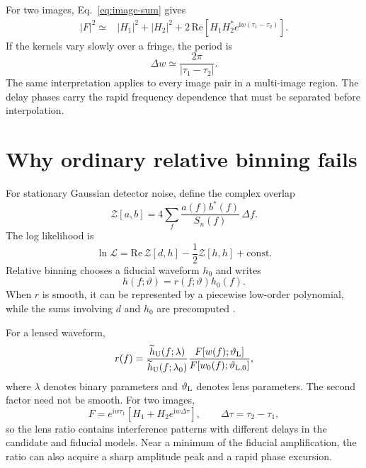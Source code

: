 \documentclass[aps,prd,twocolumn,nofootinbib,superscriptaddress,floatfix]{revtex4-2}
\newcommand{\ii}{\mathrm{i}}
\newcommand{\cZ}{\mathcal{Z}}
\begin{document}
For two images, Eq.~\eqref{eq:image-sum} gives
\begin{align}
 |F|^2\simeq{}&|H_1|^2+|H_2|^2
 +2\,\mathrm{Re}\!\left[
 H_1H_2^*e^{\ii w(\tau_1-\tau_2)}\right].
 \label{eq:two-image-interference}
\end{align}
If the kernels vary slowly over a fringe, the period is
\begin{equation}
 \Delta w\simeq\frac{2\pi}{|\tau_1-\tau_2|}.
 \label{eq:fringe-period}
\end{equation}
The same interpretation applies to every image pair in a multi-image region.
The delay phases carry the rapid frequency dependence that must be separated
before interpolation.

\section{Why ordinary relative binning fails}
\label{sec:rbfailure}

For stationary Gaussian detector noise, define the complex overlap
\begin{equation}
 \cZ[a,b]=4\sum_f\frac{a(f)b^*(f)}{S_n(f)}\,\Delta f.
 \label{eq:complex-overlap}
\end{equation}
The log likelihood is
\begin{equation}
 \ln\mathcal L=\mathrm{Re}\,\cZ[d,h]
 -\frac12\cZ[h,h]+\mathrm{const}.
 \label{eq:likelihood}
\end{equation}
Relative binning chooses a fiducial waveform $h_0$ and writes
\begin{equation}
 h(f;\vartheta)=r(f;\vartheta)h_0(f).
 \label{eq:rb-ratio}
\end{equation}
When $r$ is smooth, it can be represented by a piecewise low-order polynomial,
while the sums involving $d$ and $h_0$ are precomputed
\cite{ZackayDaiVenumadhav2018}.

For a lensed waveform,
\begin{equation}
 r(f)=
 \frac{\widetilde h_{\rm U}(f;\lambda)}
      {\widetilde h_{\rm U}(f;\lambda_0)}
 \frac{F[w(f);\vartheta_{\rm L}]}
      {F[w_0(f);\vartheta_{{\rm L},0}]},
 \label{eq:lensed-ratio}
\end{equation}
where $\lambda$ denotes binary parameters and $\vartheta_{\rm L}$ denotes lens
parameters.  The second factor need not be smooth.  For two images,
\begin{equation}
 F=e^{\ii w\tau_1}
 \left[H_1+H_2e^{\ii w\Delta\tau}\right],
 \qquad
 \Delta\tau=\tau_2-\tau_1,
 \label{eq:two-image-factorization}
\end{equation}
so the lens ratio contains interference patterns with different delays in the
candidate and fiducial models.  Near a minimum of the fiducial amplification,
the ratio can also acquire a sharp amplitude peak and a rapid phase excursion.
\end{document}
